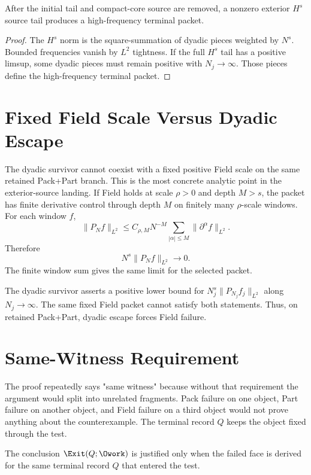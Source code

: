 \begin{proposition}
After the initial tail and compact-core source are removed, a nonzero exterior \(H^s\) source tail produces a high-frequency terminal packet.
\end{proposition}

\begin{proof}
The \(H^s\) norm is the square-summation of dyadic pieces weighted by \(N^s\).
Bounded frequencies vanish by \(L^2\) tightness.
If the full \(H^s\) tail has a positive limsup, some dyadic pieces must remain positive with \(N_j\to\infty\).
Those pieces define the high-frequency terminal packet.
\end{proof}

\section{Fixed Field Scale Versus Dyadic Escape}

The dyadic survivor cannot coexist with a fixed positive Field scale on the same retained Pack+Part branch.
This is the most concrete analytic point in the exterior-source landing.
If Field holds at scale \(\rho>0\) and depth \(M>s\), the packet has finite derivative control through depth \(M\) on finitely many \(\rho\)-scale windows.
For each window \(f\),
\[
  \|P_Nf\|_{L^2}\le C_{\rho,M}N^{-M}\sum_{|\alpha|\le M}\|\partial^\alpha f\|_{L^2}.
\]
Therefore
\[
  N^s\|P_Nf\|_{L^2}\to0.
\]
The finite window sum gives the same limit for the selected packet.

The dyadic survivor asserts a positive lower bound for \(N_j^s\|P_{N_j}f_j\|_{L^2}\) along \(N_j\to\infty\).
The same fixed Field packet cannot satisfy both statements.
Thus, on retained Pack+Part, dyadic escape forces Field failure.

\section{Same-Witness Requirement}

The proof repeatedly says "same witness" because without that requirement the argument would split into unrelated fragments.
Pack failure on one object, Part failure on another object, and Field failure on a third object would not prove anything about the counterexample.
The terminal record \(Q\) keeps the object fixed through the test.

\begin{lemma}
The conclusion \(\Exit(Q;\Owork)\) is justified only when the failed face is derived for the same terminal record \(Q\) that entered the test.
\end{lemma}

